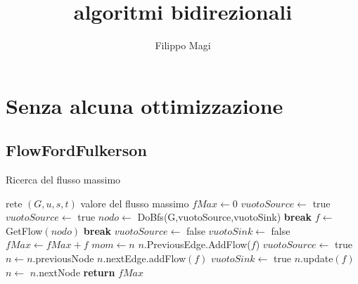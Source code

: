 \documentclass{article}
\title{algoritmi bidirezionali}
\author{Filippo Magi }
\begin{document}
\maketitle
\section{Senza alcuna ottimizzazione}
\subsection{FlowFordFulkerson}
\begin{algorithm}
    \caption{Ricerca del flusso massimo}
    \begin{algorithmic}[1]
        \REQUIRE rete $(G,u,s,t)$
        \ENSURE valore del flusso massimo
        \STATE $fMax \leftarrow 0$
        \STATE$ vuotoSource \leftarrow$ true
        \STATE $vuotoSource \leftarrow$ true
        \STATE $nodo \leftarrow$ DoBfs(G,vuotoSource,vuotoSink)
        \STATE \textbf{break}
        \ENDIF
        \STATE $f \leftarrow$ GetFlow$(nodo)$ 
        \STATE \textbf{break}
        \ENDIF
        \STATE $vuotoSource \leftarrow$ false
        \STATE $vuotoSink \leftarrow$ false
        \STATE $fMax \leftarrow fMax + f$
        \STATE $mom \leftarrow n$
        \STATE $n$.PreviousEdge.AddFlow($f$)
        \STATE $vuotoSource \leftarrow$ true
        \ENDIF
        \STATE $n \leftarrow n.$previousNode
        \ENDWHILE
        \STATE $n.$nextEdge.addFlow$(f)$
        \STATE $vuotoSink \leftarrow$ true
        \ENDIF
        \STATE $n.$update$(f)$ 
        \STATE $n \leftarrow$ $n.$nextNode
        \ENDWHILE
        \ENDWHILE
        \STATE \textbf{return} $fMax$
    \end{algorithmic}
\end{algorithm}
\end{document}
